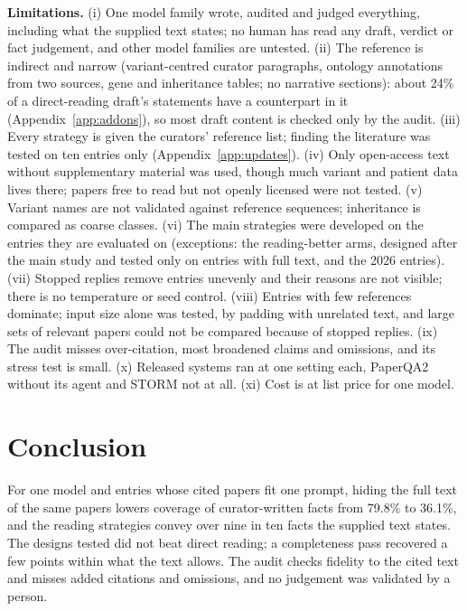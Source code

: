 \documentclass{article} %
\begin{document}
\textbf{Limitations.} (i) One model family wrote, audited and judged everything, including what the supplied text states; no human has read any draft, verdict or fact judgement, and other model families are untested. (ii) The reference is indirect and narrow (variant-centred curator paragraphs, ontology annotations from two sources, gene and inheritance tables; no narrative sections): about 24\% of a direct-reading draft's statements have a counterpart in it (Appendix~\ref{app:addons}), so most draft content is checked only by the audit. (iii) Every strategy is given the curators' reference list; finding the literature was tested on ten entries only (Appendix~\ref{app:updates}). (iv) Only open-access text without supplementary material was used, though much variant and patient data lives there; papers free to read but not openly licensed were not tested. (v) Variant names are not validated against reference sequences; inheritance is compared as coarse classes. (vi) The main strategies were developed on the entries they are evaluated on (exceptions: the reading-better arms, designed after the main study and tested only on entries with full text, and the 2026 entries). (vii) Stopped replies remove entries unevenly and their reasons are not visible; there is no temperature or seed control. (viii) Entries with few references dominate; input size alone was tested, by padding with unrelated text, and large sets of relevant papers could not be compared because of stopped replies. (ix) The audit misses over-citation, most broadened claims and omissions, and its stress test is small. (x) Released systems ran at one setting each, PaperQA2 without its agent and STORM not at all. (xi) Cost is at list price for one model.

\section{Conclusion}
\label{sec:conclusion}
For one model and entries whose cited papers fit one prompt, hiding the full text of the same papers lowers coverage of curator-written facts from 79.8\% to 36.1\%, and the reading strategies convey over nine in ten facts the supplied text states. The designs tested did not beat direct reading; a completeness pass recovered a few points within what the text allows. The audit checks fidelity to the cited text and misses added citations and omissions, and no judgement was validated by a person.
\end{document}

